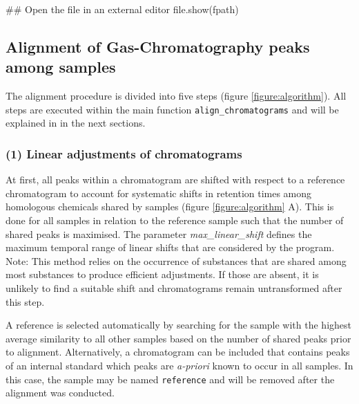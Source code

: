 \begin{Schunk}
\begin{Sinput}
## Open the file in an external editor
file.show(fpath)
\end{Sinput}
\end{Schunk}

\subsection{Alignment of Gas-Chromatography peaks among
samples}\label{alignment-of-gas-chromatography-peaks-among-samples}

The alignment procedure is divided into five steps (figure
\ref{figure:algorithm}). All steps are executed within the main function
\texttt{align\_chromatograms} and will be explained in in the next
sections.

\subsubsection{(1) Linear adjustments of
chromatograms}\label{linear-adjustments-of-chromatograms}

At first, all peaks within a chromatogram are shifted with respect to a
reference chromatogram to account for systematic shifts in retention
times among homologous chemicals shared by samples (figure
\ref{figure:algorithm} A). This is done for all samples in relation to
the reference sample such that the number of shared peaks is maximised.
The parameter \emph{max\_linear\_shift} defines the maximum temporal
range of linear shifts that are considered by the program. \newline
Note: This method relies on the occurrence of substances that are shared
among most substances to produce efficient adjustments. If those are
absent, it is unlikely to find a suitable shift and chromatograms remain
untransformed after this step. \par
A reference is selected automatically by searching for the sample with
the highest average similarity to all other samples based on the number
of shared peaks prior to alignment. Alternatively, a chromatogram can be
included that contains peaks of an internal standard which peaks are
\emph{a-priori} known to occur in all samples. In this case, the sample
may be named \texttt{reference} and will be removed after the alignment
was conducted.

